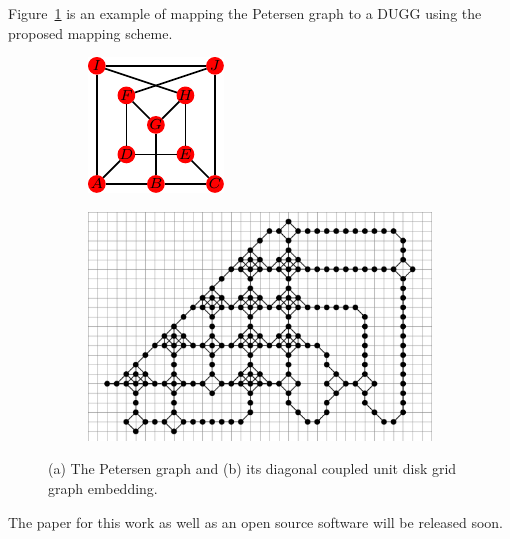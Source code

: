 \documentclass[a4paper]{article}
\newcommand{\<}{\langle}
\renewcommand{\>}{\rangle}
\begin{document}
Figure~\ref{fig:petersen} is an example of mapping the Petersen graph to a DUGG using the proposed mapping scheme.
\begin{figure}[ht]
\centering
\begin{subfigure}[b]{0.2\textwidth}
\includegraphics[width=\textwidth, trim={0cm 0cm 0cm 0cm}, clip]{petersen.pdf}
\caption{}
\end{subfigure}\hspace{20pt}
\begin{subfigure}[b]{0.5\textwidth}
\includegraphics[width=\textwidth, trim={0cm 0cm 0cm 0cm}, clip]{petersen_mapped.pdf}
\caption{}
\end{subfigure}
\caption{(a) The Petersen graph and (b) its diagonal coupled unit disk grid graph embedding.}\label{fig:petersen}
\end{figure}
The paper for this work as well as an open source software will be released soon.
\end{document}
